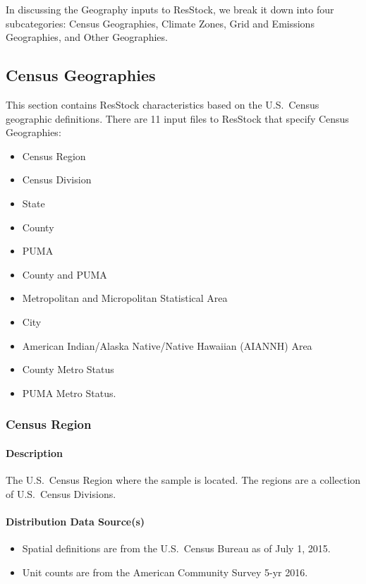 In discussing the Geography inputs to ResStock, we break it down into four subcategories: Census Geographies, Climate Zones, Grid and Emissions Geographies, and Other Geographies.

\subsection{Census Geographies}
This section contains ResStock characteristics based on the U.S.~Census geographic definitions. There are 11 input files to ResStock that specify Census Geographies:
\begin{itemize}
    \item Census Region
    \item Census Division
    \item State
    \item County
    \item PUMA
    \item County and PUMA
    \item Metropolitan and Micropolitan Statistical Area
    \item City
    \item American Indian/Alaska Native/Native Hawaiian (AIANNH) Area
    \item County Metro Status
    \item PUMA Metro Status.
\end{itemize}


\subsubsection{Census Region}
\paragraph{Description}
The U.S.~Census Region where the sample is located. The regions are a collection of U.S.~Census Divisions.

\paragraph{Distribution Data Source(s)}
\begin{itemize} 
\item
  Spatial definitions are from the U.S.~Census Bureau as of July 1,
  2015.
\item
  Unit counts are from the American Community Survey 5-yr 2016.
\end{itemize}

